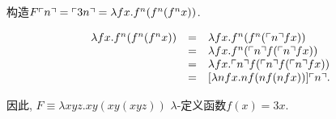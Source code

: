 \begin{solution}
     构造$F \ulcorner{n}\urcorner = \ulcorner{3n}\urcorner = \lambda fx. f^n (f^n (f^n x))$.

\[
 \begin{array}{rcl}
  \lambda fx. f^n (f^n (f^n x)) & = & \lambda fx. f^n (f^n (\ulcorner{n}\urcorner f x)) \\
  & = & \lambda fx. f^n (\ulcorner{n}\urcorner f (\ulcorner{n}\urcorner f x)) \\
  & = & \lambda fx. \ulcorner{n}\urcorner f (\ulcorner{n}\urcorner f (\ulcorner{n}\urcorner f x)) \\
  & = & [\lambda nfx. nf (nf (nfx))] \ulcorner{n}\urcorner.
 \end{array}
\]

因此, $F \equiv \lambda xyz. xy(xy(xyz))$ $\lambda$-定义函数$f(x)=3x$.
\end{solution}